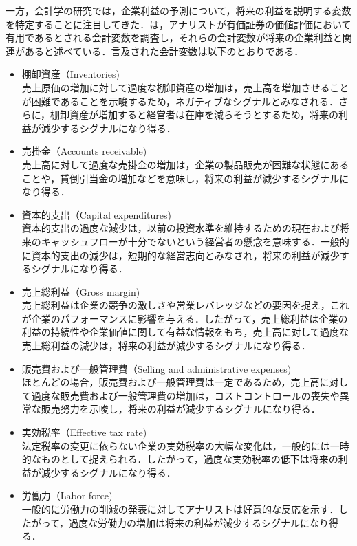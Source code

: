 \documentclass[a4paper，11pt]{jsarticle}
\begin{document}
一方，会計学の研究では，企業利益の予測について，将来の利益を説明する変数を特定することに注目してきた．\cite*{lev1993fundamental}は，アナリストが有価証券の価値評価において有用であるとされる会計変数を調査し，それらの会計変数が将来の企業利益と関連があると述べている．言及された会計変数は以下のとおりである．

\begin{itemize}
\item 棚卸資産（Inventories)\\
    売上原価の増加に対して過度な棚卸資産の増加は，売上高を増加させることが困難であることを示唆するため，ネガティブなシグナルとみなされる．さらに，棚卸資産が増加すると経営者は在庫を減らそうとするため，将来の利益が減少するシグナルになり得る．

\item 売掛金（Accounts receivable)\\
    売上高に対して過度な売掛金の増加は，企業の製品販売が困難な状態にあることや，賃倒引当金の増加などを意味し，将来の利益が減少するシグナルになり得る．

\item 資本的支出（Capital expenditures)\\
    資本的支出の過度な減少は，以前の投資水準を維持するための現在および将来のキャッシュフローが十分でないという経営者の懸念を意味する．一般的に資本的支出の減少は，短期的な経営志向とみなされ，将来の利益が減少するシグナルになり得る．

\item 売上総利益（Gross margin)\\
    売上総利益は企業の競争の激しさや営業レバレッジなどの要因を捉え，これが企業のパフォーマンスに影響を与える．したがって，売上総利益は企業の利益の持続性や企業価値に関して有益な情報をもち，売上高に対して過度な売上総利益の減少は，将来の利益が減少するシグナルになり得る．

\item 販売費および一般管理費（Selling and administrative expenses)\\
    ほとんどの場合，販売費および一般管理費は一定であるため，売上高に対して過度な販売費および一般管理費の増加は，コストコントロールの喪失や異常な販売努力を示唆し，将来の利益が減少するシグナルになり得る．

\item 実効税率（Effective tax rate)\\
    法定税率の変更に依らない企業の実効税率の大幅な変化は，一般的には一時的なものとして捉えられる．したがって，過度な実効税率の低下は将来の利益が減少するシグナルになり得る．

\item 労働力（Labor force)\\
    一般的に労働力の削減の発表に対してアナリストは好意的な反応を示す．したがって，過度な労働力の増加は将来の利益が減少するシグナルになり得る．
\end{itemize}
\end{document}
